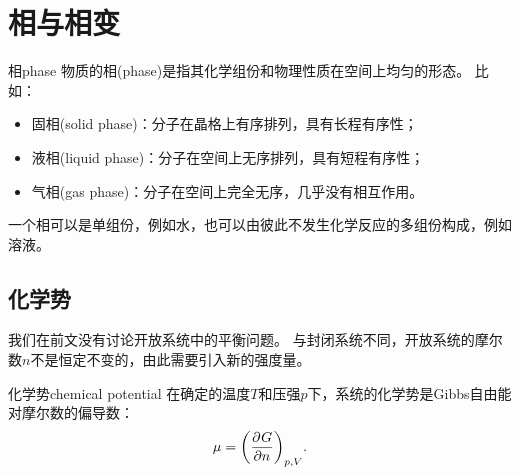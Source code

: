 \newcommand*{\crt}{\mathrm C}
\newcommand*{\tri}{_\mathrm{tr}}


\chapter{相与相变}
\label{chap:phase}

\begin{definition}
	{相}{phase}
	物质的相(phase)是指其化学组份和物理性质在空间上均匀的形态。
	比如：
	\begin{itemize}
		\item 固相(solid phase)：分子在晶格上有序排列，具有长程有序性；
		\item 液相(liquid phase)：分子在空间上无序排列，具有短程有序性；
		\item 气相(gas phase)：分子在空间上完全无序，几乎没有相互作用。
	\end{itemize}
\end{definition}

\begin{remark}
	一个相可以是单组份，例如水，也可以由彼此不发生化学反应的多组份构成，例如溶液。
\end{remark}


\section{化学势}
\label{sec:chemical potential}

我们在前文没有讨论开放系统中的平衡问题。
与封闭系统不同，开放系统的摩尔数$n$不是恒定不变的，由此需要引入新的强度量。

\begin{definition}
	{化学势}{chemical potential}
	在确定的温度$T$和压强$p$下，系统的化学势是Gibbs自由能对摩尔数的偏导数：
	\begin{equation}
		\mu=\pu[p,V]Gn.
	\end{equation}
\end{definition}

